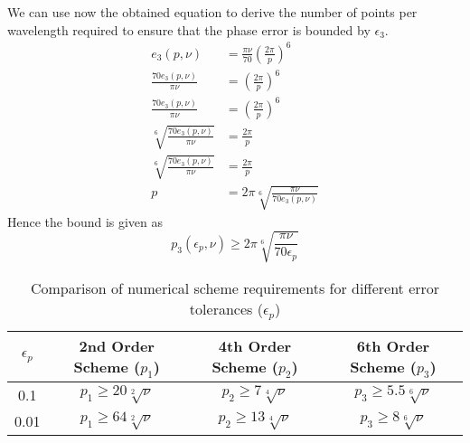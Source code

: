 We can use now the obtained equation to derive the number of points per wavelength required to ensure that the phase error is bounded by $\epsilon_3$.
\begin{equation}
	\begin{aligned}
		e_3(p, \nu)                               & = \frac{\pi \nu}{70} \left ( \frac{2\pi}{p} \right)^6 \\
		\frac{70 e_3(p, \nu)}{\pi \nu}            & =\left ( \frac{2\pi}{p} \right)^6                     \\
		\frac{70 e_3(p, \nu)}{\pi \nu}            & =\left ( \frac{2\pi}{p} \right)^6                     \\
		\sqrt[6]{\frac{70 e_3(p, \nu)}{\pi \nu} } & =  \frac{2\pi}{p}                                     \\
		\sqrt[6]{\frac{70 e_3(p, \nu)}{\pi \nu}}  & = \frac{2\pi}{p}                                      \\
		p                                         & = 2 \pi \sqrt[6]{\frac{\pi \nu}{70e_3(p, \nu)} }
	\end{aligned}
	\label{eq:bound}
\end{equation}
Hence the bound is given as
\begin{equation}
	p_3(\epsilon_p, \nu) \geq 2 \pi \sqrt[6]{\frac{\pi \nu}{70\epsilon_p} }
	\label{eq:bound_final}
\end{equation}

\begin{table}[H]
    \centering
    \begin{tabular}{|c|c|c|c|}
        \hline
        $\epsilon_p$ & 2nd Order Scheme ($p_1$) & 4th Order Scheme ($p_2$) & 6th Order Scheme ($p_3$) \\
        \hline
        0.1 & $p_1 \geq 20\sqrt[2]{\nu}$ & $p_2 \geq 7\sqrt[4]{\nu}$ & $p_3 \geq 5.5\sqrt[6]{\nu}$ \\
		\hline
        0.01 & $p_1 \geq 64\sqrt[2]{\nu}$ & $p_2 \geq 13\sqrt[4]{\nu}$ & $p_3 \geq 8\sqrt[6]{\nu}$ \\
        \hline
    \end{tabular}
    \caption{Comparison of numerical scheme requirements for different error tolerances ($\epsilon_p$)}
    \label{tab:scheme_comparison}
\end{table}

